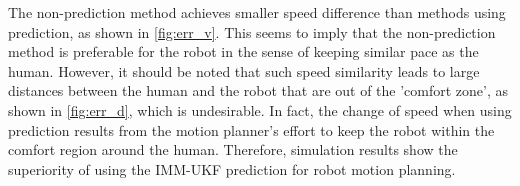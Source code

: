 \documentclass[letterpaper, 10 pt, conference]{ieeeconf}
\begin{document}
	
	The non-prediction method achieves smaller speed difference than methods using prediction, as shown in \cref{fig:err_v}.
	This seems to imply that the non-prediction method is preferable for the robot in the sense of keeping similar pace as the human.
	However, it should be noted that such speed similarity leads to large distances between the human and the robot that are out of the 'comfort zone', as shown in \cref{fig:err_d}, which is undesirable.
	In fact, the change of speed when using prediction results from the motion planner's effort to keep the robot within the comfort region around the human.
	Therefore, simulation results show the superiority of using the IMM-UKF prediction for robot motion planning.
	
\end{document}

